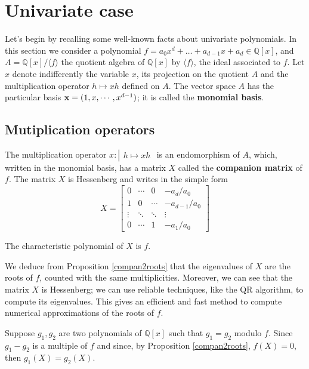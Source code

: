 \documentclass{standalone}
\begin{document}
\section{Univariate case}
\label{univariate}
Let's begin by recalling some well-known facts about univariate polynomials. In this section we consider a polynomial $f = a_0x^d + \dots + a_{d-1}x + a_d \in \mathbb{Q}[x]$, and $A = \mathbb{Q}[x]/\langle f \rangle$ the quotient algebra of $\mathbb{Q}[x]$ by $\langle f \rangle$, the ideal associated to $f$.
Let $x$ denote indifferently the variable $x$, its projection on the quotient $A$ and the multiplication operator $h\mapsto xh$ defined on $A$. The vector space $A$ has the particular basis $\bold{x} = (1, x,\cdots, x^{d-1})$; it is called the {\bf monomial basis}.

\subsection{Mutiplication operators}
The multiplication operator
$x : \left\vert
\begin{array}{c}
h \mapsto xh
\end{array}
\right.$
is an endomorphism of $A$, which, written in the monomial basis, has a matrix $X$ called the {\bf companion matrix} of $f$. The matrix $X$ is Hessenberg and writes in the simple form
\begin{equation}
\label{compan}
X =
\begin{bmatrix}
	0 & \cdots & 0 & -a_d/a_0 \\
	1 & 0 & \cdots & -a_{d-1}/a_0 \\
	\vdots  & \ddots  & \ddots & \vdots  \\
	0 & \cdots & 1 & -a_1/a_0
\end{bmatrix}
\end{equation}
\begin{prop}
\label{compan2roots}
The characteristic polynomial of $X$ is $f$.
\end{prop}

\begin{rem}
We deduce from Proposition \ref{compan2roots} that the eigenvalues of $X$ are the roots of $f$, counted with the same multiplicities. Moreover, we can see that the matrix $X$ is Hessenberg; we can use reliable techniques, like the QR algorithm, to compute its eigenvalues. This gives an efficient and fast method to compute numerical approximations of the roots of $f$. 
\end{rem}

\begin{rem}
\label{g_1=g_2}
Suppose $g_1, g_2$ are two polynomials of $\mathbb{Q}[x]$ such that $g_1 = g_2$ modulo $f$. Since $g_1-g_2$ is a multiple of $f$ and since, by Proposition \ref{compan2roots}, $f(X) = 0$, then $g_1(X) = g_2(X)$.
\end{rem}
\end{document}
